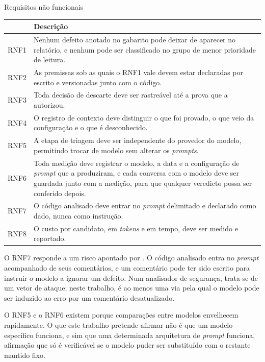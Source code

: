 \begin{quadro}[htb]
  \caption{\label{quadro:rnf}Requisitos não funcionais}
  \small
  \begin{tabular}{|l|L{11.6cm}|}
    \hline
    & Descrição \\
    \hline
    RNF1 & Nenhum defeito anotado no gabarito pode deixar de aparecer no relatório, e nenhum pode ser classificado no grupo de menor prioridade de leitura. \\
    \hline
    RNF2 & As premissas sob as quais o RNF1 vale devem estar declaradas por escrito e versionadas junto com o código. \\
    \hline
    RNF3 & Toda decisão de descarte deve ser rastreável até a prova que a autorizou. \\
    \hline
    RNF4 & O registro de contexto deve distinguir o que foi provado, o que veio da configuração e o que é desconhecido. \\
    \hline
    RNF5 & A etapa de triagem deve ser independente do provedor do modelo, permitindo trocar de modelo sem alterar os \textit{prompts}. \\
    \hline
    RNF6 & Toda medição deve registrar o modelo, a data e a configuração de \textit{prompt} que a produziram, e cada conversa com o modelo deve ser guardada junto com a medição, para que qualquer veredicto possa ser conferido depois. \\
    \hline
    RNF7 & O código analisado deve entrar no \textit{prompt} delimitado e declarado como dado, nunca como instrução. \\
    \hline
    RNF8 & O custo por candidato, em \textit{tokens} e em tempo, deve ser medido e reportado. \\
    \hline
  \end{tabular}
\end{quadro}

O RNF7 responde a um risco apontado por . O código
analisado entra no \textit{prompt} acompanhado de seus comentários, e um
comentário pode ter sido escrito para instruir o modelo a ignorar um defeito.
Num analisador de segurança, trata-se de um vetor de ataque; neste trabalho,
é ao menos uma via pela qual o modelo pode ser induzido ao erro por um
comentário desatualizado.

O RNF5 e o RNF6 existem porque comparações entre modelos envelhecem
rapidamente. O que este trabalho pretende afirmar não é que um modelo
específico funciona, e sim que uma determinada arquitetura de \textit{prompt}
funciona, afirmação que só é verificável se o modelo puder ser substituído com
o restante mantido fixo.


